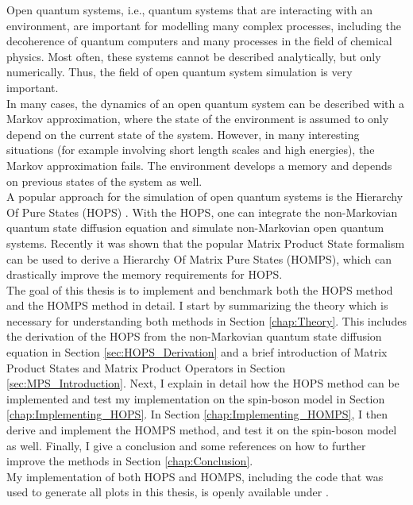 Open quantum systems, i.e., quantum systems that are interacting with an environment, are important for modelling many complex
processes, including the decoherence of quantum computers and many processes in the field of chemical physics.
Most often, these systems cannot be described analytically, but only numerically. Thus, the field of open quantum system
simulation is very important.\\
In many cases, the dynamics of an open quantum system can be described with a Markov approximation, where the state of the environment
is assumed to only depend on the current state of the system. However, in many interesting situations (for example involving short length scales
and high energies), the Markov approximation fails. The environment develops a memory and depends on previous states of the system as well.\\
A popular approach for the simulation of open quantum systems is the Hierarchy Of Pure States (HOPS) \cite{Suess:2014}.
With the HOPS, one can integrate the non-Markovian quantum state diffusion equation and simulate non-Markovian open quantum systems.
Recently it was shown \cite{Gao:2022} that the popular Matrix Product State formalism can be used to derive a Hierarchy Of Matrix Pure States (HOMPS),
which can drastically improve the memory requirements for HOPS. \\
The goal of this thesis is to implement and benchmark both the HOPS method and the HOMPS method in detail. I start by summarizing the theory
which is necessary for understanding both methods in Section \ref{chap:Theory}. This includes the derivation of the HOPS from the non-Markovian
quantum state diffusion equation in Section \ref{sec:HOPS_Derivation} and a brief introduction of Matrix Product States and Matrix Product Operators 
in Section \ref{sec:MPS_Introduction}. 
Next, I explain in detail how the HOPS method can be implemented and test my implementation on the spin-boson model in Section \ref{chap:Implementing_HOPS}.
In Section \ref{chap:Implementing_HOMPS}, I then derive and implement the HOMPS method, and test it on the spin-boson model as well. 
Finally, I give a conclusion and some references on how to further improve the methods in Section \ref{chap:Conclusion}.
\\
My implementation of both HOPS and HOMPS, including the code that was used to generate all plots in this thesis, is openly available
under \cite{Sappler:2023}.


